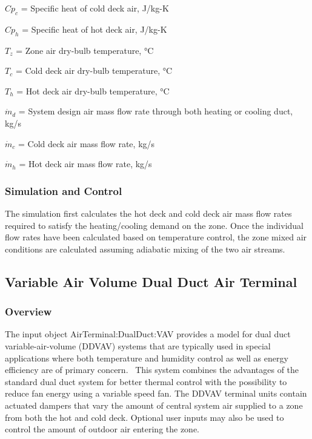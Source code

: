 \(C{p_c}\) = Specific heat of cold deck air, J/kg-K

\(C{p_h}\) = Specific heat of hot deck air, J/kg-K

\({T_z}\) = Zone air dry-bulb temperature, °C

\({T_c}\) = Cold deck air dry-bulb temperature, °C

\({T_h}\) = Hot deck air dry-bulb temperature, °C

\({\dot m_d}\) = System design air mass flow rate through both heating or cooling duct, kg/s

\({\dot m_c}\) = Cold deck air mass flow rate, kg/s

\({\dot m_h}\) = Hot deck air mass flow rate, kg/s

\subsubsection{Simulation and Control}\label{simulation-and-control-5}

The simulation first calculates the hot deck and cold deck air mass flow rates required to satisfy the heating/cooling demand on the zone. Once the individual flow rates have been calculated based on temperature control, the zone mixed air conditions are calculated assuming adiabatic mixing of the two air streams.

\subsection{Variable Air Volume Dual Duct Air Terminal}\label{variable-air-volume-dual-duct-air-terminal}

\subsubsection{Overview}\label{overview-4-000}

The input object AirTerminal:DualDuct:VAV provides a model for dual duct variable-air-volume (DDVAV) systems that are typically used in special applications where both temperature and humidity control as well as energy efficiency are of primary concern.~ This system combines the advantages of the standard dual duct system for better thermal control with the possibility to reduce fan energy using a variable speed fan. The DDVAV terminal units contain actuated dampers that vary the amount of central system air supplied to a zone from both the hot and cold deck. Optional user inputs may also be used to control the amount of outdoor air entering the zone.

